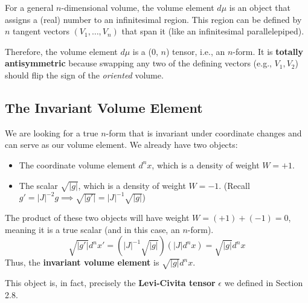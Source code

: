 \documentclass[11pt, a4paper]{report}
\begin{document}
For a general $n$-dimensional volume, the volume element $d\mu$ is an object that assigns a (real) number to an infinitesimal region. This region can be defined by $n$ tangent vectors $(V_1, \dots, V_n)$ that span it (like an infinitesimal parallelepiped).

Therefore, the volume element $d\mu$ is a (0, $n$) tensor, i.e., an $n$-form. It is \textbf{totally antisymmetric} because swapping any two of the defining vectors (e.g., $V_1, V_2$) should flip the sign of the \emph{oriented} volume.

\subsection*{The Invariant Volume Element}
We are looking for a true $n$-form that is invariant under coordinate changes and can serve as our volume element.
We already have two objects:
\begin{itemize}
    \item The coordinate volume element $d^n x$, which is a density of weight $W=+1$.
    \item The scalar $\sqrt{|g|}$, which is a density of weight $W=-1$.
    (Recall $g' = |J|^{-2}g \implies \sqrt{|g'|} = |J|^{-1}\sqrt{|g|}$)
\end{itemize}
The product of these two objects will have weight $W = (+1) + (-1) = 0$, meaning it is a true scalar (and in this case, an $n$-form).
\[
    \sqrt{|g'|} d^n x' = \left( |J|^{-1} \sqrt{|g|} \right) \left( |J| d^n x \right) = \sqrt{|g|} d^n x
\]
Thus, the \textbf{invariant volume element} is $\sqrt{|g|} d^n x$.

This object is, in fact, precisely the \textbf{Levi-Civita tensor} $\epsilon$ we defined in Section 2.8.
\end{document}
